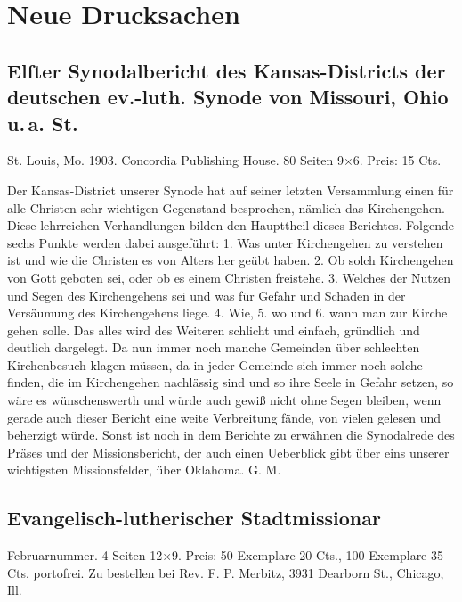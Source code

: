 \chapter{Neue Drucksachen}

\section[Elfter Synodalbericht]{Elfter Synodalbericht des Kansas-Districts der deutschen ev.-luth. Synode von Missouri, Ohio u.\,a. St.}
St. Louis, Mo. 1903. Concordia Publishing House. 80 Seiten 9×6. Preis: 15 Cts.

Der Kansas-District unserer Synode hat auf seiner letzten Versammlung einen für alle Christen sehr wichtigen Gegenstand besprochen, nämlich das Kirchengehen. Diese lehrreichen Verhandlungen bilden den Haupttheil dieses Berichtes. Folgende sechs Punkte werden dabei ausgeführt: 1. Was unter Kirchengehen zu verstehen ist und wie die Christen es von Alters her geübt haben. 2. Ob solch Kirchengehen von Gott geboten sei, oder ob es einem Christen freistehe. 3. Welches der Nutzen und Segen des Kirchengehens sei und was für Gefahr und Schaden in der Versäumung des Kirchengehens liege. 4. Wie, 5. wo und 6. wann man zur Kirche gehen solle. Das alles wird des Weiteren schlicht und einfach, gründlich und deutlich dargelegt. Da nun immer noch manche Gemeinden über schlechten Kirchenbesuch klagen müssen, da in jeder Gemeinde sich immer noch solche finden, die im Kirchengehen nachlässig sind und so ihre Seele in Gefahr setzen, so wäre es wünschenswerth und würde auch gewiß nicht ohne Segen bleiben, wenn gerade auch dieser Bericht eine weite Verbreitung fände, von vielen gelesen und beherzigt würde. Sonst ist noch in dem Berichte zu erwähnen die Synodalrede des Präses und der Missionsbericht, der auch einen Ueberblick gibt über eins unserer wichtigsten Missionsfelder, über Oklahoma. G. M.

\section[Evangelisch-lutherischer Stadtmissionar]{Evangelisch-lutherischer Stadtmissionar}
Februarnummer. 4 Seiten 12×9. Preis: 50 Exemplare 20 Cts., 100 Exemplare 35 Cts. portofrei. Zu bestellen bei Rev. F. P. Merbitz, 3931 Dearborn St., Chicago, Ill.

